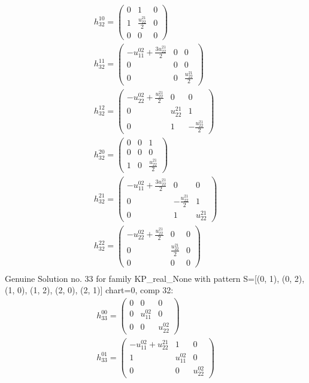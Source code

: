 \documentclass[a4paper, 11pt, twoside, onecolumn]{article}
\begin{document}
\begin{landscape}
\begin{gather*}
	 h_{32}^{10}=\begin{pmatrix}0 & 1 & 0\\1 & \frac{u^{21}_{22}}{2} & 0\\0 & 0 & 0\end{pmatrix}\\ 
	 h_{32}^{11}=\begin{pmatrix}- u^{02}_{11} + \frac{3 u^{21}_{22}}{2} & 0 & 0\\0 & 0 & 0\\0 & 0 & \frac{u^{21}_{22}}{2}\end{pmatrix}\\ 
	 h_{32}^{12}=\begin{pmatrix}- u^{02}_{22} + \frac{u^{21}_{22}}{2} & 0 & 0\\0 & u^{21}_{22} & 1\\0 & 1 & - \frac{u^{21}_{22}}{2}\end{pmatrix}\\ 
	 h_{32}^{20}=\begin{pmatrix}0 & 0 & 1\\0 & 0 & 0\\1 & 0 & \frac{u^{21}_{22}}{2}\end{pmatrix}\\ 
	 h_{32}^{21}=\begin{pmatrix}- u^{02}_{11} + \frac{3 u^{21}_{22}}{2} & 0 & 0\\0 & - \frac{u^{21}_{22}}{2} & 1\\0 & 1 & u^{21}_{22}\end{pmatrix}\\ 
	 h_{32}^{22}=\begin{pmatrix}- u^{02}_{22} + \frac{u^{21}_{22}}{2} & 0 & 0\\0 & \frac{u^{21}_{22}}{2} & 0\\0 & 0 & 0\end{pmatrix}\\ 
\end{gather*} 
Genuine Solution no. 33 for family KP_real_None with pattern S=[(0, 1), (0, 2), (1, 0), (1, 2), (2, 0), (2, 1)] chart=0, comp 32: 
\begin{gather*} 
	 h_{33}^{00}=\begin{pmatrix}0 & 0 & 0\\0 & u^{02}_{11} & 0\\0 & 0 & u^{02}_{22}\end{pmatrix}\\ 
	 h_{33}^{01}=\begin{pmatrix}- u^{02}_{11} + u^{21}_{22} & 1 & 0\\1 & u^{02}_{11} & 0\\0 & 0 & u^{02}_{22}\end{pmatrix}\\ 

\end{gather*}
\end{landscape}
\end{document}
